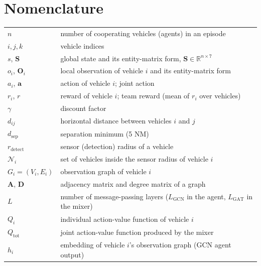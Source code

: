 \section{Nomenclature}

{\renewcommand\arraystretch{1.0}
\noindent\begin{longtable*}{@{}l @{\quad=\quad} l@{}}
$n$                        & number of cooperating vehicles (agents) in an episode \\
$i,j,k$                    & vehicle indices \\
$s$, $\mathbf{S}$          & global state and its entity-matrix form, $\mathbf{S}\in\mathbb{R}^{n\times 7}$ \\
$o_i$, $\mathbf{O}_i$      & local observation of vehicle $i$ and its entity-matrix form \\
$a_i$, $\mathbf{a}$        & action of vehicle $i$; joint action \\
$r_i$, $r$                 & reward of vehicle $i$; team reward (mean of $r_i$ over vehicles) \\
$\gamma$                   & discount factor \\
$d_{ij}$                   & horizontal distance between vehicles $i$ and $j$ \\
$d_{\text{sep}}$           & separation minimum (5 NM) \\
$r_{\text{detect}}$        & sensor (detection) radius of a vehicle \\
$\mathcal{N}_i$            & set of vehicles inside the sensor radius of vehicle $i$ \\
$G_i=(V_i,E_i)$            & observation graph of vehicle $i$ \\
$\mathbf{A}$, $\mathbf{D}$ & adjacency matrix and degree matrix of a graph \\
$L$                        & number of message-passing layers ($L_{\text{GCN}}$ in the agent, $L_{\text{GAT}}$ in the mixer) \\
$Q_i$                      & individual action-value function of vehicle $i$ \\
$Q_{\text{tot}}$           & joint action-value function produced by the mixer \\
$h_i$                      & embedding of vehicle $i$'s observation graph (GCN agent output) \\

\end{longtable*}}
